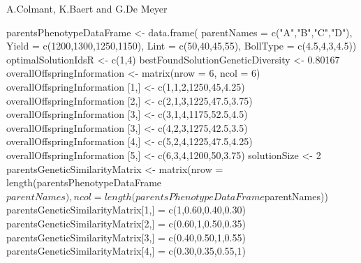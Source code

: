 \documentclass[a4paper]{book}
\begin{document}
%
\begin{Author}\relax
A.Colmant, K.Baert and G.De Meyer
\end{Author}
%
\begin{Examples}
\begin{ExampleCode}
parentsPhenotypeDataFrame <- data.frame(
parentNames = c("A","B","C","D"),
Yield = c(1200,1300,1250,1150),
Lint = c(50,40,45,55),
BollType = c(4.5,4,3,4.5))
optimalSolutionIdsR <- c(1,4)
bestFoundSolutionGeneticDiversity <- 0.80167
overallOffspringInformation <- matrix(nrow = 6, ncol = 6)
overallOffspringInformation [1,] <- c(1,1,2,1250,45,4.25)
overallOffspringInformation [2,] <- c(2,1,3,1225,47.5,3.75)
overallOffspringInformation [3,] <- c(3,1,4,1175,52.5,4.5)
overallOffspringInformation [3,] <- c(4,2,3,1275,42.5,3.5)
overallOffspringInformation [4,] <- c(5,2,4,1225,47.5,4.25)
overallOffspringInformation [5,] <- c(6,3,4,1200,50,3.75)
solutionSize <- 2
parentsGeneticSimilarityMatrix <- matrix(nrow = length(parentsPhenotypeDataFrame$parentNames), ncol = length(parentsPhenotypeDataFrame$parentNames))
parentsGeneticSimilarityMatrix[1,] = c(1,0.60,0.40,0.30)
parentsGeneticSimilarityMatrix[2,] = c(0.60,1,0.50,0.35)
parentsGeneticSimilarityMatrix[3,] = c(0.40,0.50,1,0.55)
parentsGeneticSimilarityMatrix[4,] = c(0.30,0.35,0.55,1)

\end{ExampleCode}
\end{Examples}
\printindex{}
\end{document}
